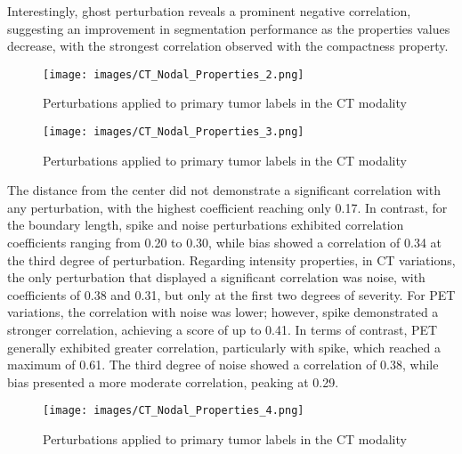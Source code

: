 Interestingly, ghost perturbation reveals a prominent negative correlation, suggesting an improvement in segmentation performance as the properties values decrease, with the strongest correlation observed with the compactness property.
\begin{figure}[ht]
    \centering
    \texttt{[image: images/CT\_Nodal\_Properties\_2.png]}
    \caption{Perturbations applied to primary tumor labels in the CT modality}
    \label{fig:three_subfigures}
\end{figure}

\begin{figure}[ht]
    \centering
    \texttt{[image: images/CT\_Nodal\_Properties\_3.png]}
    \caption{Perturbations applied to primary tumor labels in the CT modality}
    \label{fig:three_subfigures}
\end{figure}
\newpage
The distance from the center did not demonstrate a significant correlation with any perturbation, with the highest coefficient reaching only 0.17. In contrast, for the boundary length, spike and noise perturbations exhibited correlation coefficients ranging from 0.20 to 0.30, while bias showed a correlation of 0.34 at the third degree of perturbation.
Regarding intensity properties, in CT variations, the only perturbation that displayed a significant correlation was noise, with coefficients of 0.38 and 0.31, but only at the first two degrees of severity. For PET variations, the correlation with noise was lower; however, spike demonstrated a stronger correlation, achieving a score of up to 0.41.
In terms of contrast, PET generally exhibited greater correlation, particularly with spike, which reached a maximum of 0.61. The third degree of noise showed a correlation of 0.38, while bias presented a more moderate correlation, peaking at 0.29.
\begin{figure}[ht]
    \centering
    \texttt{[image: images/CT\_Nodal\_Properties\_4.png]}
    \caption{Perturbations applied to primary tumor labels in the CT modality}
    \label{fig:three_subfigures}
\end{figure}

